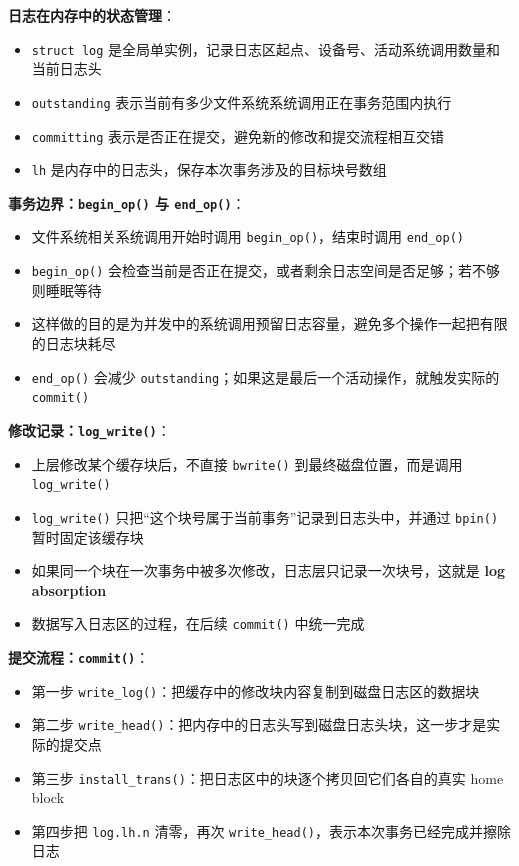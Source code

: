 \documentclass[12pt,a4paper]{ctexart}
\begin{document}
\textbf{日志在内存中的状态管理}：
\begin{itemize}
  \item \texttt{struct log} 是全局单实例，记录日志区起点、设备号、活动系统调用数量和当前日志头
  \item \texttt{outstanding} 表示当前有多少文件系统系统调用正在事务范围内执行
  \item \texttt{committing} 表示是否正在提交，避免新的修改和提交流程相互交错
  \item \texttt{lh} 是内存中的日志头，保存本次事务涉及的目标块号数组
\end{itemize}

\textbf{事务边界：\texttt{begin\_op()} 与 \texttt{end\_op()}}：
\begin{itemize}
  \item 文件系统相关系统调用开始时调用 \texttt{begin\_op()}，结束时调用 \texttt{end\_op()}
  \item \texttt{begin\_op()} 会检查当前是否正在提交，或者剩余日志空间是否足够；若不够则睡眠等待
  \item 这样做的目的是为并发中的系统调用预留日志容量，避免多个操作一起把有限的日志块耗尽
  \item \texttt{end\_op()} 会减少 \texttt{outstanding}；如果这是最后一个活动操作，就触发实际的 \texttt{commit()}
\end{itemize}

\textbf{修改记录：\texttt{log\_write()}}：
\begin{itemize}
  \item 上层修改某个缓存块后，不直接 \texttt{bwrite()} 到最终磁盘位置，而是调用 \texttt{log\_write()}
  \item \texttt{log\_write()} 只把“这个块号属于当前事务”记录到日志头中，并通过 \texttt{bpin()} 暂时固定该缓存块
  \item 如果同一个块在一次事务中被多次修改，日志层只记录一次块号，这就是 \textbf{log absorption}
  \item 数据写入日志区的过程，在后续 \texttt{commit()} 中统一完成
\end{itemize}

\textbf{提交流程：\texttt{commit()}}：
\begin{itemize}
  \item 第一步 \texttt{write\_log()}：把缓存中的修改块内容复制到磁盘日志区的数据块
  \item 第二步 \texttt{write\_head()}：把内存中的日志头写到磁盘日志头块，这一步才是实际的提交点
  \item 第三步 \texttt{install\_trans()}：把日志区中的块逐个拷贝回它们各自的真实 home block
  \item 第四步把 \texttt{log.lh.n} 清零，再次 \texttt{write\_head()}，表示本次事务已经完成并擦除日志
\end{itemize}
\end{document}
